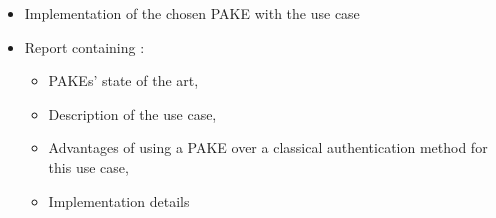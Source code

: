 ﻿\documentclass[../report.tex]{subfiles}
\begin{document}
\begin{itemize}
 \item Implementation of the chosen PAKE with the use case
 \item Report containing :
 \begin{itemize}
    \item PAKEs' state of the art,
    \item Description of the use case,
    \item Advantages of using a PAKE over a classical authentication method for this use case,
    \item Implementation details
 \end{itemize}
\end{itemize}
\end{document}
